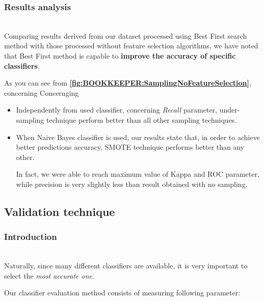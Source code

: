 \documentclass[sigconf]{acmart}
\begin{document}
\subsubsection{Results analysis}
\hfill\\
Comparing results derived from our dataset processed using Best First search method with those processed without feature selection algorithms, we have noted that Best First method is capable to \textbf{improve the accuracy of specific classifiers}.

As you can see from \textbf{\cref{fig:BOOKKEEPER:SamplingNoFeatureSelection}}, concerning
Concernging 

\begin{itemize}
\item Independently from used classifier, concerning \textit{Recall} parameter, under-sampling technique perform better than all other sampling techniques.

\item When Naive Bayes classifier is used, our results state that, in order to achieve better predictions accuracy, SMOTE technique performs better than any other. 

In fact, we were able to reach maximum value of Kappa and ROC parameter, while precision is very slightly less than result obtained with no sampling. 

\end{itemize}




\subsection{Validation technique}

\subsubsection{Introduction}
\hfill\\
Naturally, since many different classifiers are available, it is very important to select the \textit{most accurate one}. 

Our classifier evaluation method consists of measuring following parameter:
\end{document}
